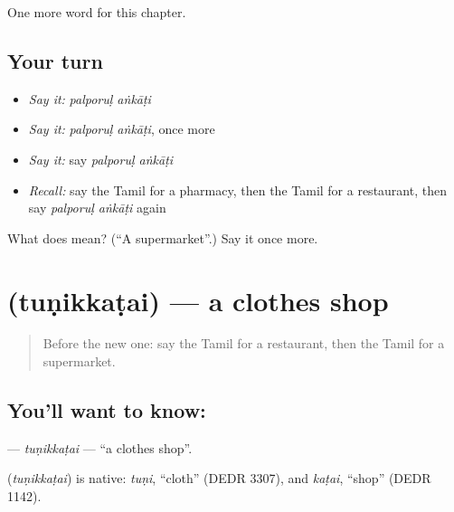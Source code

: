 \begin{grammarlens}[title={What you've built}]
One more word for this chapter.
\end{grammarlens}

\subsection*{Your turn}
\begin{itemize}
\raggedright
  \item \emph{Say it:} \emph{palporuḷ aṅkāṭi}
  \item \emph{Say it:} \emph{palporuḷ aṅkāṭi}, once more
  \item \emph{Say it:} say \emph{palporuḷ aṅkāṭi}
  \item \emph{Recall:} say the Tamil for a pharmacy, then the Tamil for a restaurant, then say \emph{palporuḷ aṅkāṭi} again
\end{itemize}

\begin{tcolorbox}[breakable,colback=teal!4,colframe=teal!35!black,title={Before you move on}]
What does   mean? (\textquotedblleft{}A supermarket\textquotedblright{}.) Say it once more.
\end{tcolorbox}
\section[\texorpdfstring{\ta{துணிக்கடை} (tuṇikkaṭai)}{துணிக்கடை (tuṇikkaṭai)}]{ (tuṇikkaṭai) — a clothes shop}

\label{lesson:TA-C204-tunikkatai}



\begin{quote}
Before the new one: say the Tamil for a restaurant, then the Tamil for a supermarket.
\end{quote}

\subsection*{You'll want to know: }
\textbf{} — \emph{tuṇikkaṭai} — \textquotedblleft{}a clothes shop\textquotedblright{}.

\begin{cousinweb}
\textbf{} (\emph{tuṇikkaṭai}) is native: \emph{tuṇi}, \textquotedblleft{}cloth\textquotedblright{} (DEDR 3307), and \emph{kaṭai}, \textquotedblleft{}shop\textquotedblright{} (DEDR 1142).
\end{cousinweb}

